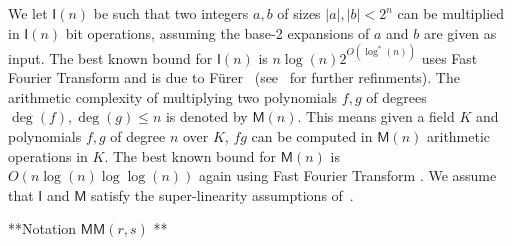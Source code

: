 \documentclass[acmtoms]{acmsmall}
\def\N{\mathbb{N}}
\def\M{\mathsf{M}}
\def\I{\mathsf{I}}
\begin{document}
  
We let $\I(n)$ be such that two integers $a,b$ of sizes $|a|,|b| < 2^n$ can be multiplied in $\I(n)$
bit operations, assuming the base-2 expansions of $a$ and $b$ are given as input. The best known
bound for $\I(n)$ is $n\log(n)2^{O(\log^*(n))}$ uses Fast Fourier Transform and is due to
F\"urer~\cite{Furer07} (see~\cite{xxx,yyy} for further refinments). The arithmetic complexity of
multiplying two polynomials $f,g$ of degrees $\deg(f), \deg(g) \le n$ is denoted by $\M(n)$. This
means given a field $K$ and polynomials $f, g$ of degree $n$ over $K$, $fg$ can be computed in
$\M(n)$ arithmetic operations in $K$. The best known bound for $\M(n)$ is $O(n\log(n)\log\log(n))$
again using Fast Fourier Transform \cite{Schonhage1971,CaKa91}.  We assume that $\I$ and $\M$
satisfy the super-linearity assumptions of~\cite[Chapter~8]{GaGe13}.






**Notation $\M\M(r,s)$ **
\end{document}
